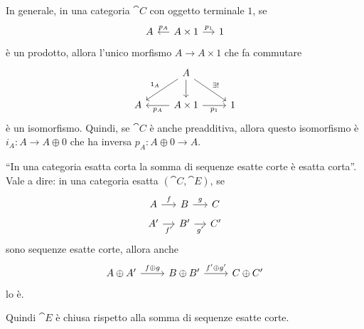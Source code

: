 \begin{recall}
  In generale, in una categoria \(\cat C\) con oggetto terminale \(1\),
  se
  \[
    \begin{tikzcd}[column sep=small]
      A & A \times 1 \ar["{p_A}", l, swap] \ar["{p_1}", r] & 1
    \end{tikzcd}
  \]
  è un prodotto, allora l'unico morfismo \(A \to A \times 1\) che fa
  commutare
  \[
    \begin{tikzcd}
      & A \ar["{\id_A}", dl, swap] \ar["{}", d]  \ar["{\exists!}",dr] \\
      A & A \times 1 \ar["{p_A}", l] \ar["{p_1}", r, swap] & 1
    \end{tikzcd}
  \]
  è un isomorfismo. Quindi, se \(\cat C\) è anche preadditiva, allora
  questo isomorfismo è \(i_A : A \to A \oplus 0\) che ha inversa
  \(p_A : A \oplus 0 \to A\).
\end{recall}

\begin{proposition}\label{proposition:SumExactSeqsIsExact}
  ``In una categoria esatta corta la somma di sequenze esatte corte è
  esatta corta''. Vale a dire: in una categoria esatta
  \((\cat C,\cat E)\), se
  \[
    \begin{tikzcd}[row sep=tiny, column sep=small]
      A \ar["{f}", r] & B \ar["{g}", r] & C \\
      A' \ar["{f'}", r, swap] & B' \ar["{g'}", r, swap] & C'
    \end{tikzcd}
  \]
  sono sequenze esatte corte, allora anche
  \begin{equation}
    \label{cd:SumExactSeqs}
    \begin{tikzcd}[row sep=small]
      A \oplus A' \ar["{f \oplus g}", r] & B \oplus B' \ar["{f' \oplus
        g'}", r] & C \oplus C'
    \end{tikzcd}
  \end{equation}
  lo è.
\end{proposition}

Quindi \(\cat E\) è chiusa rispetto alla somma di sequenze esatte corte.


